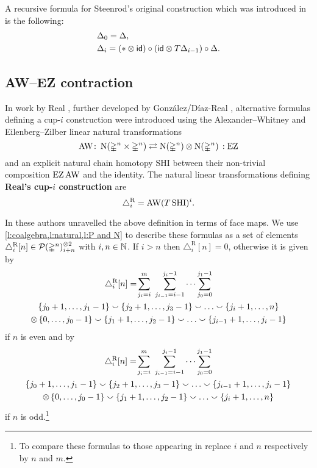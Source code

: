 A recursive formula for Steenrod's original construction which was introduced in \cite{medina2023dennis} is the following:
\begin{equation}\label{e:prop cup-i}
	\begin{split}
		& \Delta_0 = \Delta, \\
		& \Delta_i =
		(\ast \otimes \mathsf{id}) \circ (\mathsf{id} \otimes T \Delta_{i-1}) \circ \Delta.
	\end{split}
\end{equation}

\subsection{AW--EZ contraction}\label{ss:real}

In work by Real \cite{real1996computability}, further developed by Gonz\'alez\-/D\'iaz\--Real \cite{gonzalez-diaz1999steenrod, gonzalez2003computation, gonzalez-diaz2005cocyclic}, alternative formulas defining a \mbox{cup-$i$} construction were introduced using the Alexander--Whitney and Eilenberg--Zilber linear natural transformations
\[
\operatorname{AW} \colon \operatorname{N}(\mathbb{\Delta}^n \times \mathbb{\Delta}^n)
\rightleftarrows
\operatorname{N}(\mathbb{\Delta}^n) \otimes \operatorname{N}(\mathbb{\Delta}^n) \,: \operatorname{EZ}
\]
and an explicit natural chain homotopy $\mathrm{SHI}$ between their non-trivial composition $\operatorname{EZ} \operatorname{AW}$ and the identity.
The natural linear transformations defining \textbf{Real's \mbox{cup-$i$} construction} are
\[
\triangle^{\mathrm{R}}_i = \operatorname{AW} (T \, \mathrm{SHI})^i.
\]

In \cite[Theorem~3.1]{gonzalez-diaz1999steenrod} these authors unravelled the above definition in terms of face maps.
We use \cref{l:coalgebra,l:natural,l:P and N} to describe these formulas as a set of elements $\triangle_i^{\mathrm{R}} [n] \in \mathcal{P}(\mathbb{\Delta}^n)^{\otimes 2}_{i+n}$ with $i,n \in \mathbb{N}$.
If $i > n$ then $\triangle_i^{\mathrm{R}} [n] = 0$, otherwise it is given by
\begin{multline}\label{eq:real left}
	\triangle^{\mathrm{R}}_i [n] = \!
	\sum_{j_i=i}^{m} \ \sum_{j_{i-1}=i-1}^{j_i-1} \dots \sum_{j_0=0}^{j_1-1} \\
	\{j_0+1,\dots,j_1-1\} \union \{j_2+1,\dots,j_3-1\} \union \dots \union \{j_i+1,\dots,n\} \\ \ot \,
	\{0,\dots,j_0-1\} \union \{j_1+1,\dots,j_2-1\} \union \dots \union \{j_{i-1}+1,\dots,j_i-1\}
\end{multline}
if $n$ is even and by
\begin{multline}\label{eq:real right}
	\triangle^\rR_i [n] = \!
	\sum_{j_i=i}^{m} \ \sum_{j_{i-1}=i-1}^{j_i-1} \dots \sum_{j_0=0}^{j_1-1} \\
	\{j_0+1,\dots,j_1-1\} \union \{j_2+1,\dots,j_3-1\} \union \dots \union \{j_{i-1}+1,\dots,j_i-1\} \\ \ot \,
	\{0,\dots,j_0-1\} \union \{j_1+1,\dots,j_2-1\} \union \dots \union \{j_i+1,\dots,n\}
\end{multline}
if $n$ is odd.\footnote{To compare these formulas to those appearing in \cite[Theorem~3.1]{gonzalez-diaz1999steenrod} replace $i$ and $n$ respectively by $n$ and $m$.}

